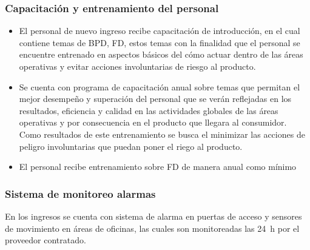 \subsubsection{Capacitación y entrenamiento del personal}
\begin{itemize}
	\item El personal de nuevo ingreso recibe capacitación de introducción, en el cual contiene temas de BPD, \gls{FD}, estos temas con la finalidad que el personal se encuentre entrenado en aspectos básicos del cómo actuar dentro de las áreas operativas y evitar acciones involuntarias de riesgo al producto.
	\item Se cuenta con programa de capacitación anual sobre temas que permitan el mejor desempeño y superación del personal que se verán reflejadas en los resultados, eficiencia y calidad en las actividades globales de las áreas operativas y por consecuencia en el producto que llegara al consumidor. Como resultados de este entrenamiento se busca el minimizar las acciones de peligro involuntarias que puedan poner el riego al producto.
	\item El personal recibe entrenamiento sobre \gls{FD} de manera anual como mínimo
\end{itemize}

\subsubsection{Sistema de monitoreo alarmas}
En los ingresos se cuenta con sistema de alarma en puertas de acceso y sensores de movimiento en áreas de oficinas, las cuales son monitoreadas las \qty{24}{\hour} por el proveedor contratado.

